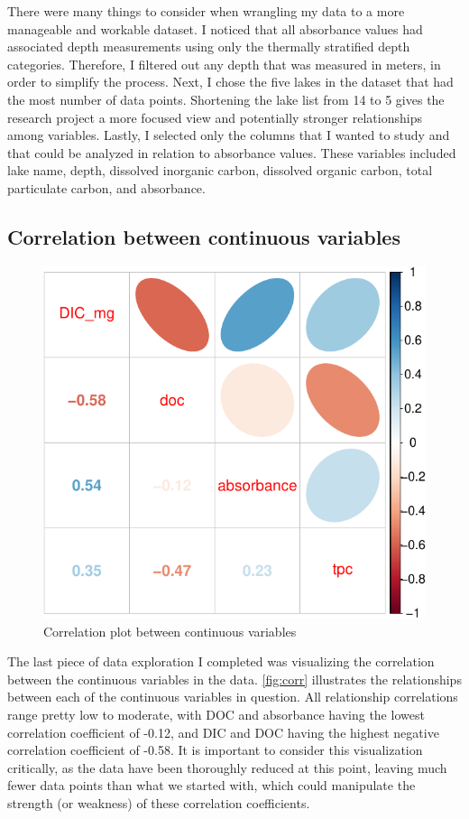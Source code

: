 \documentclass[12pt,]{article}
\begin{document}
There were many things to consider when wrangling my data to a more
manageable and workable dataset. I noticed that all absorbance values
had associated depth measurements using only the thermally stratified
depth categories. Therefore, I filtered out any depth that was measured
in meters, in order to simplify the process. Next, I chose the five
lakes in the dataset that had the most number of data points. Shortening
the lake list from 14 to 5 gives the research project a more focused
view and potentially stronger relationships among variables. Lastly, I
selected only the columns that I wanted to study and that could be
analyzed in relation to absorbance values. These variables included lake
name, depth, dissolved inorganic carbon, dissolved organic carbon, total
particulate carbon, and absorbance.

\subsection{Correlation between continuous
variables}\label{correlation-between-continuous-variables}

\begin{figure}
\centering
\includegraphics{Bash_ENV872_Project_files/figure-latex/corr-1.pdf}
\caption{\label{fig:corr} Correlation plot between continuous variables}
\end{figure}

The last piece of data exploration I completed was visualizing the
correlation between the continuous variables in the data.
\autoref{fig:corr} illustrates the relationships between each of the
continuous variables in question. All relationship correlations range
pretty low to moderate, with DOC and absorbance having the lowest
correlation coefficient of -0.12, and DIC and DOC having the highest
negative correlation coefficient of -0.58. It is important to consider
this visualization critically, as the data have been thoroughly reduced
at this point, leaving much fewer data points than what we started with,
which could manipulate the strength (or weakness) of these correlation
coefficients.
\end{document}
